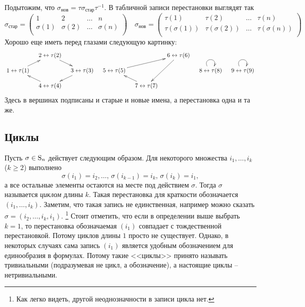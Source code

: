 Подытожим, что $\sigma_\text{нов}=\tau\sigma_\text{стар}\tau^{-1}$.
В табличной записи перестановки выглядят так
\[
\sigma_\text{стар} = 
\begin{pmatrix}
{1}&{2}&{\ldots}&{n}\\
{\sigma(1)}&{\sigma(2)}&{\ldots}&{\sigma(n)}\\
\end{pmatrix}\quad
\sigma_\text{нов} = 
\begin{pmatrix}
{\tau(1)}&{\tau(2)}&{\ldots}&{\tau(n)}\\
{\tau(\sigma(1))}&{\tau(\sigma(2))}&{\ldots}&{\tau(\sigma(n))}\\
\end{pmatrix}
\]
Хорошо еще иметь перед глазами следующую картинку:
\[
\xymatrix@R=10pt@C=10pt{
	{}&{2\leftrightarrow\tau(2)}\ar[dr]&{}&{}&{}&{6\leftrightarrow\tau(6)}\ar[ddl]&{}&{}\\
	{1\leftrightarrow\tau(1)}\ar[ur]&{}&{3\leftrightarrow\tau(3)}\ar[dl]&{5\leftrightarrow\tau(5)}\ar[urr]&{}&{}&{8\leftrightarrow\tau(8)}\ar@(ul,ur)&{9\leftrightarrow\tau(9)}\ar@(ul,ur)\\
	{}&{4\leftrightarrow\tau(4)}\ar[ul]&{}&{}&{7\leftrightarrow\tau(7)}\ar[ul]&{}&{}&{}\\
}
\]
Здесь в вершинах подписаны и старые и новые имена, а перестановка одна и та же.

\subsection{Циклы}

Пусть $\sigma\in \operatorname{S}_{n}$ действует следующим образом.
Для некоторого множества $i_1,\ldots,i_k$ ($k\geqslant 2$) выполнено 
\[
\sigma(i_1) = i_2,\ldots,\,\sigma(i_{k-1}) = i_k,\,\sigma(i_k) = i_1,
\]
а все остальные элементы остаются на месте под действием $\sigma$.
Тогда $\sigma$ называется {\it циклом} длины $k$.
Такая перестановка для краткости обозначается $(i_1,\ldots,i_k)$.
Заметим, что такая запись не единственная, например можно сказать $\sigma = (i_2,\ldots,i_k,i_1)$.%
\footnote{Как легко видеть, другой неоднозначности в записи цикла нет.}
Стоит отметить, что если в определении выше выбрать $k=1$, то перестановка обозначаемая $(i_1)$ совпадает с тождественной перестановкой.
Потому циклов длины $1$ просто не существует.
Однако, в некоторых случаях сама запись $(i_1)$ является удобным обозначением для единообразия в формулах.
Потому такие <<циклы>> принято называть тривиальными (подразумевая не цикл, а обозначение), а настоящие циклы -- нетривиальными.

